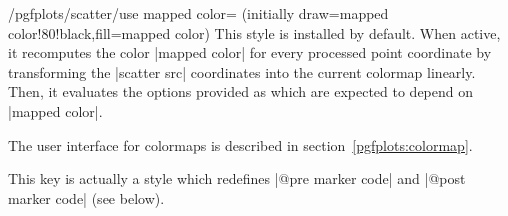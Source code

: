 \begin{stylekey}{/pgfplots/scatter/use mapped color= (initially draw=mapped color!80!black,fill=mapped color)}
	This style is installed by default. When active, it recomputes the color |mapped color| for every processed point coordinate by transforming the |scatter src| coordinates into the current colormap linearly. Then, it evaluates the options provided as  which are expected to depend on |mapped color|.

	The user interface for colormaps is described in section~\ref{pgfplots:colormap}.
\begin{codeexample}[]
\end{codeexample}

\begin{codeexample}[]
\end{codeexample}

\begin{codeexample}[]
\end{codeexample}
	This key is actually a style which redefines |@pre marker code| and |@post marker code| (see below).
\end{stylekey}

